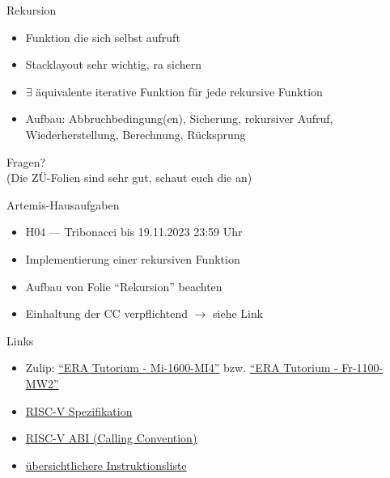 \documentclass[
  german,            %
  aspectratio=169,    %
]{tumbeamer}
\begin{document}
\begin{frame}[fragile, c]{Rekursion}{}
  \begin{itemize}
    \item Funktion die sich selbst aufruft
    \item Stacklayout sehr wichtig, ra sichern
    \item $\exists$ äquivalente iterative Funktion für jede rekursive Funktion
    \item Aufbau: Abbruchbedingung(en), Sicherung, rekursiver Aufruf, Wiederherstellung, Berechnung, Rücksprung
  \end{itemize}  
\end{frame}


\begin{frame}[c]{}{}
  \begin{center}
    \LARGE Fragen?\\
    \Large (Die ZÜ-Folien sind sehr gut, schaut euch die an)
  \end{center}
\end{frame}

\begin{frame}[c]{Artemis-Hausaufgaben}{}
  \begin{itemize}
    \item H04 --- Tribonacci bis 19.11.2023 23:59 Uhr
    \item Implementierung einer rekursiven Funktion
    \item Aufbau von Folie \enquote{Rekursion} beachten
    \item Einhaltung der CC verpflichtend $\rightarrow$ siehe Link
  \end{itemize}
\end{frame}

\begin{frame}[fragile, c]{Links}{}
  \begin{itemize}
    \item Zulip: \href{https://zulip.in.tum.de/#narrow/stream/1917-ERA-Tutorium---Mi-1600-MI4}{\enquote{ERA Tutorium - Mi-1600-MI4}}
    bzw. \href{https://zulip.in.tum.de/#narrow/stream/1940-ERA-Tutorium---Fr-1100-MW2}{\enquote{ERA Tutorium - Fr-1100-MW2}}
    \item \href{https://riscv.org/wp-content/uploads/2017/05/riscv-spec-v2.2.pdf}{RISC-V Spezifikation}
    \item \href{https://www.moodle.tum.de/mod/url/view.php?id=2810277}{RISC-V ABI (Calling Convention)}
    \item \href{https://msyksphinz-self.github.io/riscv-isadoc/html/rvi.html}{übersichtlichere Instruktionsliste}
  \end{itemize}
\end{frame}

\maketitle
\end{document}
